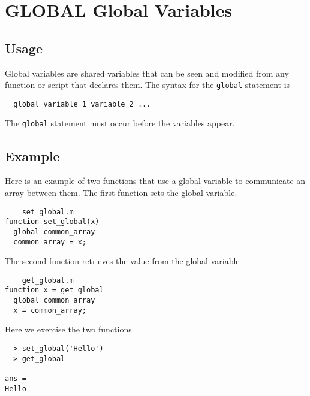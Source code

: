 \section{GLOBAL Global Variables}

\subsection{Usage}

Global variables are shared variables that can be
seen and modified from any function or script that 
declares them.  The syntax for the \verb|global| statement
is
\begin{verbatim}
  global variable_1 variable_2 ...
\end{verbatim}
The \verb|global| statement must occur before the variables
appear.
\subsection{Example}

Here is an example of two functions that use a global
variable to communicate an array between them.  The
first function sets the global variable.
\begin{verbatim}
    set_global.m
function set_global(x)
  global common_array
  common_array = x;
\end{verbatim}
The second function retrieves the value from the global
variable
\begin{verbatim}
    get_global.m
function x = get_global
  global common_array
  x = common_array;
\end{verbatim}
Here we exercise the two functions
\begin{verbatim}
--> set_global('Hello')
--> get_global

ans = 
Hello
\end{verbatim}
